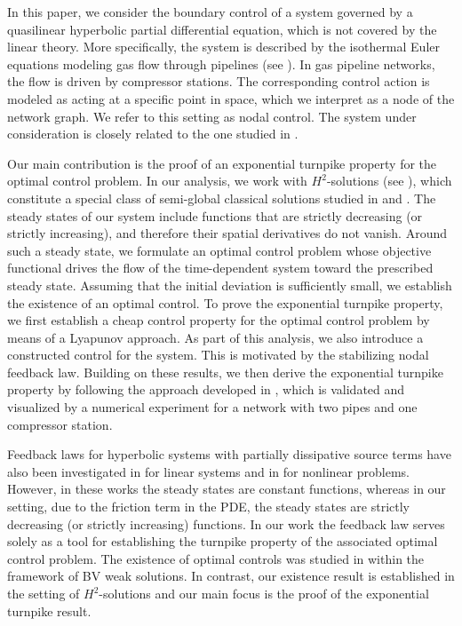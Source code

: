 \documentclass[12pt]{article}
\numberwithin{equation}{section}
\begin{document}
In this paper, we consider the boundary control of a system governed by a quasilinear hyperbolic partial differential equation, which is not covered by the linear theory. More specifically, the system is described by the isothermal Euler equations modeling gas flow through pipelines (see \cite{gugat2022modeling}). In gas pipeline networks, the flow is driven by compressor stations. The corresponding control action is modeled as acting at a specific point in space, which we interpret as a node of the network graph. We refer to this setting as nodal control. The system under consideration is closely related to the one studied in \cite{MR2775185}.
 
Our main contribution is the proof of an exponential turnpike property for the optimal control problem. In our analysis, we work with $H^2$-solutions (see \cite{Coron-book}), which constitute a special class of semi-global classical solutions studied in \cite{MR2655971} and \cite{wang2006exact}.
The steady states of our system include functions that are strictly decreasing (or strictly increasing), and therefore their spatial derivatives do not vanish. Around such a steady state, we formulate an optimal control problem whose objective functional drives the flow of the time-dependent system toward the prescribed steady state. Assuming that the initial deviation is sufficiently small, we establish the existence of an optimal control.
To prove the exponential turnpike property, we first establish a cheap control property for the optimal control problem by means of a Lyapunov approach. As part of this analysis, we also introduce a constructed control for the system. This is motivated by the stabilizing nodal feedback law. Building on these results, we then derive the exponential turnpike property by following the approach developed in \cite{MR4955417}, which is validated and visualized by a numerical experiment for a network with two pipes and one compressor station. 

Feedback laws for hyperbolic systems with partially dissipative source terms have also been investigated in \cite{MR3500083,MR4759437,MR3895286} for linear systems and in \cite{wang2020boundary,MR4898367} for nonlinear problems. However, in these works the steady states are constant functions, whereas in our setting, due to the friction term in the PDE, the steady states are strictly decreasing (or strictly increasing) functions. In our work the feedback law serves solely as a tool for establishing the turnpike property of the associated optimal control problem.
The existence of optimal controls was studied in \cite{MR2516198} within the framework of BV weak solutions. In contrast, our existence result is established in the setting of $H^2$-solutions and our main focus is the proof of the exponential turnpike result. 
\end{document}
